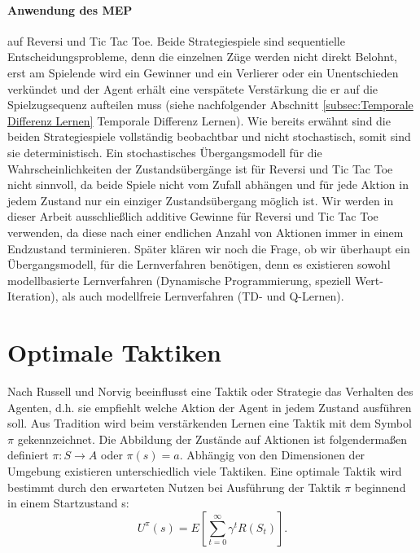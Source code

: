 \paragraph{Anwendung des MEP} auf Reversi und Tic Tac Toe. Beide Strategiespiele sind sequentielle Entscheidungsprobleme, denn die einzelnen Züge werden nicht direkt Belohnt, erst am Spielende wird ein Gewinner und ein Verlierer oder ein Unentschieden verkündet und der Agent erhält eine verspätete Verstärkung die er auf die Spielzugsequenz aufteilen muss (siehe nachfolgender Abschnitt \ref{subsec:Temporale Differenz Lernen} Temporale Differenz Lernen). Wie bereits erwähnt sind die beiden Strategiespiele vollständig beobachtbar und nicht stochastisch, somit sind sie deterministisch. Ein stochastisches Übergangsmodell für die Wahrscheinlichkeiten der Zustandsübergänge ist für Reversi und Tic Tac Toe nicht sinnvoll, da beide Spiele nicht vom Zufall abhängen und für jede Aktion in jedem Zustand nur ein einziger Zustandsübergang möglich ist. Wir werden in dieser Arbeit ausschließlich additive Gewinne für Reversi und Tic Tac Toe verwenden, da diese nach einer endlichen Anzahl von Aktionen immer in einem Endzustand terminieren. Später klären wir noch die Frage, ob wir überhaupt ein Übergangsmodell, für die Lernverfahren benötigen, denn es existieren sowohl modellbasierte Lernverfahren (Dynamische Programmierung, speziell Wert-Iteration), als auch modellfreie Lernverfahren (TD- und Q-Lernen). 

\section{Optimale Taktiken}
\label{sec:Optimale Taktiken}
Nach Russell und Norvig \cite[757\psq]{Russell} beeinflusst eine Taktik oder Strategie das Verhalten des Agenten, d.h. sie empfiehlt welche Aktion der Agent in jedem Zustand ausführen soll. Aus Tradition wird beim verstärkenden Lernen eine Taktik mit dem Symbol $\pi$ gekennzeichnet. Die Abbildung der Zustände auf Aktionen ist folgendermaßen definiert $\pi : S \rightarrow A$ oder $\pi(s) = a$. Abhängig von den Dimensionen der Umgebung existieren unterschiedlich viele Taktiken. Eine optimale Taktik wird bestimmt durch den erwarteten Nutzen bei Ausführung der Taktik $\pi$ beginnend in einem Startzustand s:\\

\begin{equation}
\label{eq:Der erwartete Nutzen}
U^\pi(s) = E\left[\sum_{t=0}^{\infty} \gamma^t R(S_t)\right].
\end{equation}

